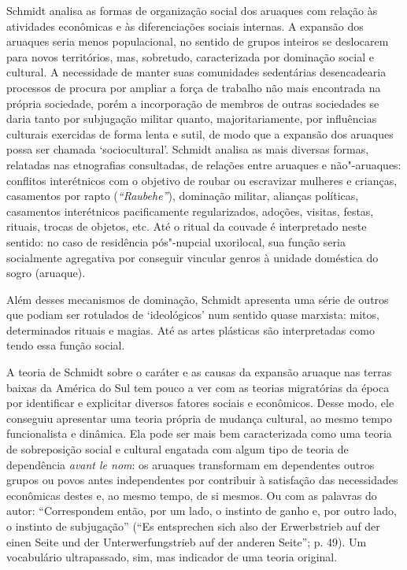 Schmidt analisa as formas de organização social dos aruaques com
relação às atividades econômicas e às diferenciações sociais internas. A
expansão dos aruaques seria menos populacional, no sentido de grupos
inteiros se deslocarem para novos territórios, mas, sobretudo,
caracterizada por dominação social e cultural. A necessidade de manter
suas comunidades sedentárias desencadearia processos de procura por
ampliar a força de trabalho não mais encontrada na própria sociedade,
porém a incorporação de membros de outras sociedades se daria tanto por
subjugação militar quanto, majoritariamente, por influências culturais
exercidas de forma lenta e sutil, de modo que a expansão dos aruaques
possa ser chamada `sociocultural'. Schmidt analisa as mais diversas
formas, relatadas nas etnografias consultadas, de relações entre
aruaques e não"-aruaques: conflitos interétnicos com o objetivo de roubar
ou escravizar mulheres e crianças, casamentos por rapto
(\emph{``Raubehe''}), dominação militar, alianças políticas, casamentos
interétnicos pacificamente regularizados, adoções, visitas, festas,
rituais, trocas de objetos, etc. Até o ritual da couvade é interpretado
neste sentido: no caso de residência pós"-nupcial uxorilocal, sua função
seria socialmente agregativa por conseguir vincular genros à unidade
doméstica do sogro (aruaque).

Além desses mecanismos de dominação, Schmidt apresenta uma série de
outros que podiam ser rotulados de `ideológicos' num sentido quase
marxista: mitos, determinados rituais e magias. Até as artes plásticas
são interpretadas como tendo essa função social.

A teoria de Schmidt sobre o caráter e as causas da expansão aruaque nas
terras baixas da América do Sul tem pouco a ver com as teorias
migratórias da época por identificar e explicitar diversos fatores
sociais e econômicos. Desse modo, ele conseguiu apresentar uma teoria
própria de mudança cultural, ao mesmo tempo funcionalista e dinâmica.
Ela pode ser mais bem caracterizada como uma teoria de sobreposição
social e cultural engatada com algum tipo de teoria de dependência
\emph{avant le nom}: os aruaques transformam em dependentes outros
grupos ou povos antes independentes por contribuir à satisfação das
necessidades econômicas destes e, ao mesmo tempo, de si mesmos. Ou com
as palavras do autor: ``Correspondem então, por um lado, o instinto de
ganho e, por outro lado, o instinto de subjugação'' (``Es entsprechen
sich also der Erwerbstrieb auf der einen Seite und der
Unterwerfungstrieb auf der anderen Seite''; p. 49). Um vocabulário
ultrapassado, sim, mas indicador de uma teoria original.

